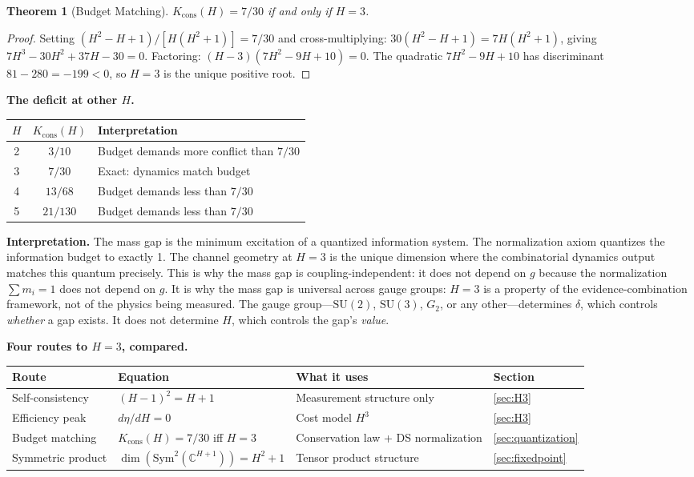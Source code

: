 \documentclass[11pt,a4paper]{article}
\newtheorem{theorem}{Theorem}[section]
\theoremstyle{definition}
\theoremstyle{remark}
\newcommand{\C}{\mathbb{C}}
\newcommand{\SU}{\mathrm{SU}}
\begin{document}
\begin{theorem}[Budget Matching]\label{thm:budget}
$K_{\mathrm{cons}}(H)=7/30$ if and only if $H=3$.
\end{theorem}

\begin{proof}
Setting $(H^2-H+1)/[H(H^2+1)]=7/30$ and cross-multiplying: $30(H^2-H+1)=7H(H^2+1)$, giving $7H^3-30H^2+37H-30=0$. Factoring: $(H-3)(7H^2-9H+10)=0$. The quadratic $7H^2-9H+10$ has discriminant $81-280=-199<0$, so $H=3$ is the unique positive root.
\end{proof}

\textbf{The deficit at other $H$.}

\begin{center}
\begin{tabular}{ccl}
\toprule
$H$ & $K_{\mathrm{cons}}(H)$ & Interpretation \\
\midrule
2 & $3/10$ & Budget demands more conflict than $7/30$ \\
3 & $7/30$ & Exact: dynamics match budget \\
4 & $13/68$ & Budget demands less than $7/30$ \\
5 & $21/130$ & Budget demands less than $7/30$ \\
\bottomrule
\end{tabular}
\end{center}

\textbf{Interpretation.} The mass gap is the minimum excitation of a quantized information system. The normalization axiom quantizes the information budget to exactly 1. The channel geometry at $H=3$ is the unique dimension where the combinatorial dynamics output matches this quantum precisely. This is why the mass gap is coupling-independent: it does not depend on $g$ because the normalization $\sum m_i=1$ does not depend on $g$. It is why the mass gap is universal across gauge groups: $H=3$ is a property of the evidence-combination framework, not of the physics being measured. The gauge group---$\SU(2)$, $\SU(3)$, $G_2$, or any other---determines $\delta$, which controls \emph{whether} a gap exists. It does not determine $H$, which controls the gap's \emph{value}.

\textbf{Four routes to $H=3$, compared.}

\begin{center}
\begin{tabular}{llll}
\toprule
Route & Equation & What it uses & Section \\
\midrule
Self-consistency & $(H-1)^2=H+1$ & Measurement structure only & \ref{sec:H3} \\
Efficiency peak & $d\eta/dH=0$ & Cost model $H^3$ & \ref{sec:H3} \\
Budget matching & $K_{\mathrm{cons}}(H)=7/30$ iff $H=3$ & Conservation law + DS normalization & \ref{sec:quantization} \\
Symmetric product & $\dim(\mathrm{Sym}^2(\C^{H+1}))=H^2+1$ & Tensor product structure & \ref{sec:fixedpoint} \\
\bottomrule
\end{tabular}
\end{center}
\end{document}
